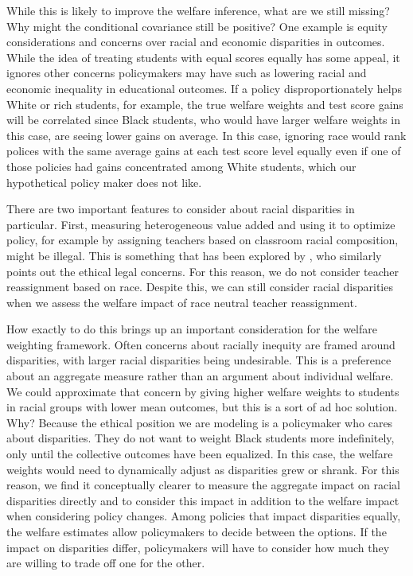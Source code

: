 \documentclass[12pt]{article}
\theoremstyle{definition}
\theoremstyle{definition}
\theoremstyle{definition}
\theoremstyle{definition}
\begin{document}
    While this is likely to improve the welfare inference, what are we still missing? Why might the conditional covariance still be positive? One example is equity considerations and concerns over racial and economic disparities in outcomes. While the idea of treating students with equal scores equally has some appeal, it ignores other concerns policymakers may have such as lowering racial and economic inequality in educational outcomes. If a policy disproportionately helps White or rich students, for example, the true welfare weights and test score gains will be correlated since Black students, who would have larger welfare weights in this case, are seeing lower gains on average. In this case, ignoring race would rank polices with the same average gains at each test score level equally even if one of those policies had gains concentrated among White students, which our hypothetical policy maker does not like.

    There are two important features to consider about racial disparities in particular. First, measuring heterogeneous value added and using it to optimize policy, for example by assigning teachers based on classroom racial composition, might be illegal. This is something that has been explored by \citet{Delgado2020}, who similarly points out the ethical legal concerns. For this reason, we do not consider teacher reassignment based on race. Despite this, we can still consider racial disparities when we assess the welfare impact of race neutral teacher reassignment. 
    
    How exactly to do this brings up an important consideration for the welfare weighting framework. Often concerns about racially inequity are framed around disparities, with larger racial disparities being undesirable. This is a preference about an aggregate measure rather than an argument about individual welfare. We could approximate that concern by giving higher welfare weights to students in racial groups with lower mean outcomes, but this is a sort of ad hoc solution. Why? Because the ethical position we are modeling is a policymaker who cares about disparities. They do not want to weight Black students more indefinitely, only until the collective outcomes have been equalized. In this case, the welfare weights would need to dynamically adjust as disparities grew or shrank. For this reason, we find it conceptually clearer to measure the aggregate impact on racial disparities directly and to consider this impact in addition to the welfare impact when considering policy changes. Among policies that impact disparities equally, the welfare estimates allow policymakers to decide between the options. If the impact on disparities differ, policymakers will have to consider how much they are willing to trade off one for the other.      
\end{document}
